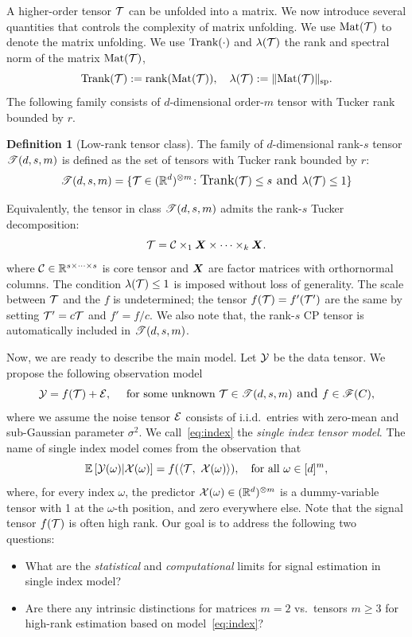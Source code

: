 \documentclass[11pt]{article}
\theoremstyle{plain}
\theoremstyle{definition}
\newtheorem{defn}{Definition}
\def\rank{\textup{Trank}}
\def\Mat{\textup{Mat}}
\def\calif{\large\mathscr{F}}
\def\caliT{\large\mathscr{T}}
\begin{document}
A higher-order tensor $\mathcal{T}$ can be unfolded into a matrix. We now introduce several quantities that controls the complexity of matrix unfolding. We use $\Mat(\tT)$ to denote the matrix unfolding. We use $\rank(\cdot)$ and $\lambda(\mathcal{T})$ the rank and spectral norm of the matrix $\Mat(\tT)$, 
\[
\rank(\tT):=\text{rank}(\Mat(\tT)), \quad  \lambda(\tT):=\snormSize{}{\Mat(\tT)}.
\]
The following family consists of $d$-dimensional order-$m$ tensor with Tucker rank bounded by $r$. 
\begin{defn}[Low-rank tensor class] The family of $d$-dimensional rank-$s$ tensor $\caliT(d,s,m)$ is defined as the set of tensors with Tucker rank bounded by $r$:
\[
\caliT(d,s,m)=\{\tT\in (\mathbb{R}^{d})^{\otimes m}\colon \rank(\tT)\leq s \text{ and } \lambda(\tT)\leq 1\}
\]
\end{defn}
Equivalently, the tensor in class $\caliT(d,s,m)$ admits the rank-$s$ Tucker decomposition:
\[
\mathcal{T}=\mathcal{C}\times_1\bm X\times\cdots\times_k \bm X.
\]
where $\mathcal{C}\in\mathbb{R}^{s\times \cdots \times s}$ is core tensor and $\bm X$ are factor matrices with orthornormal columns. The condition $\lambda(\mathcal{T})\leq 1$ is imposed without loss of generality. The scale between $\mathcal{T}$ and the $f$ is undetermined; the tensor $f(\mathcal{T})=f'(\mathcal{T}')$ are the same by setting $\mathcal{T}'=c\mathcal{T}$ and $f'=f/c$. 
We also note that, the rank-$s$ CP tensor is automatically included in $\caliT(d,s,m)$. 


Now, we are ready to describe the main model. Let $\mathcal{Y}$ be the data tensor. We propose the following observation model
\begin{equation}\label{eq:index}
\tY=f(\tT)+\tE, \quad \text{ for some unknown } \tT\in\caliT(d,s,m) \text{ and }f\in\calif(C),
\end{equation}
where we assume the noise tensor $\mathcal{E}$ consists of i.i.d.\ entries with zero-mean and sub-Gaussian parameter $\sigma^2$. We call~\eqref{eq:index} the \emph{single index tensor model}. The name of single index model comes from the observation that 
\[
\mathbb{E}\left[\mathcal{Y}(\omega)|\mathcal{X}(\omega)\right]=f(\langle \mathcal{T},\  \mathcal{X}(\omega)\rangle), \quad \text{for all }\omega\in[d]^m,
\]
where, for every index $\omega$, the predictor $\mathcal{X}(\omega)\in(\mathbb{R}^d)^{\otimes m}$ is a dummy-variable tensor with 1 at the $\omega$-th position, and zero everywhere else. 
Note that the signal tensor $f(\mathcal{T})$ is often high rank. Our goal is to address the following two questions:
\begin{itemize}
\item What are the \emph{statistical} and \emph{computational} limits for signal estimation in single index model?
\item Are there any intrinsic distinctions for matrices $m=2$ vs.\ tensors $m\geq 3$ for high-rank estimation based on model~\eqref{eq:index}?
\end{itemize}
\end{document}
